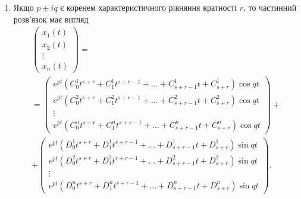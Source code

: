 \begin{enumerate}
\begin{enumerate}
		\item Якщо $p \pm iq$ є коренем характеристичного рівняння кратності $r$, то частинний розв'язок має вигляд
		\begin{multline*}
			\begin{pmatrix} x_1(t) \\ x_2(t) \\ \vdots \\ x_n(t) \end{pmatrix} = \\
			= \begin{pmatrix} e^{pt} (C_0^1 t^{s + r} + C_1^1 t^{s + r - 1} + \ldots + C_{s + r - 1}^1 t + C_{s + r}^1) \cos qt \\ e^{pt} (C_0^2 t^{s + r} + C_1^2 t^{s + r - 1} + \ldots + C_{s + r - 1}^2 t + C_{s + r}^2) \cos qt \\ \vdots \\ e^{pt} (C_0^n t^{s + r} + C_1^n t^{s + r - 1} + \ldots + C_{s + r - 1}^n t + C_{s + r}^n) \cos qt \end{pmatrix} + \\
			+ \begin{pmatrix} e^{pt} (D_0^1 t^{s + r} + D_1^1 t^{s + r - 1} + \ldots + D_{s + r - 1}^1 t + D_{s + r}^1) \sin qt \\ e^{pt} (D_0^2 t^{s + r} + D_1^2 t^{s + r - 1} + \ldots + D_{s + r - 1}^2 t + D_{s + r}^2) \sin qt \\ \vdots \\ e^{pt} (D_0^n t^{s + r} + D_1^n t^{s + r - 1} + \ldots + D_{s + r - 1}^n t + D_{s + r}^n) \sin qt \end{pmatrix}.
		\end{multline*}
	\end{enumerate} 
\end{enumerate}
